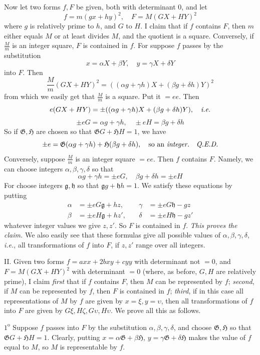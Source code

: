 Now let two forms $f,F$ be given, both with determinant 0, and let
\[
f=m(gx+hy)^2,\quad F=M(GX+HY)^2
\]
where $g$ is relatively prime to $h$, and $G$ to $H$. I claim that if $f$ contains $F$, then $m$ either equals $M$ or at least divides $M$, and the quotient is a square. Conversely, if $\frac{M}{m}$ is an integer square, $F$ is contained in $f$. For suppose $f$ passes by the substitution
\[
x=\alpha X+\beta Y,\quad y=\gamma X+\delta Y
\]
into $F$. Then
\[
\frac{M}{m}(GX+HY)^2=((\alpha g+\gamma h)X+(\beta g+\delta h)Y)^2
\]
from which we easily get that $\frac{M}{m}$ is a square. Put it $=ee$. Then
\[
e(GX+HY)=\pm((\alpha g+\gamma h)X+(\beta g+\delta h)Y),\quad\text{\textit{i.e.}}
\]
\[
\pm eG=\alpha g+\gamma h,\quad\pm eH=\beta g+\delta h
\]
So if $\mathfrak{G},\mathfrak{H}$ are chosen so that $\mathfrak{G}G+\mathfrak{H}H=1$, we have
\[
\pm e=\mathfrak{G}(\alpha g+\gamma h)+\mathfrak{H}(\beta g+\delta h),\quad\text{so an \textit{integer.}\quad\textit{Q.E.D.}}
\]
Conversely, suppose $\frac{M}{m}$ is an integer square $=ee$. Then $f$ contains $F$. Namely, we can choose integers $\alpha,\beta,\gamma,\delta$ so that
\[
\alpha g+\gamma h=\pm eG,\quad \beta g+\delta h=\pm eH
\]
For choose integers $\mathfrak{g},\mathfrak{h}$ so that $\mathfrak{g}g+\mathfrak{h}h=1$. We satisfy these equations by putting
\[
\begin{aligned}
\alpha&=\pm eG\mathfrak{g}+hz, &\quad\gamma&=\pm eG\mathfrak{h}-gz\\
\beta&=\pm eH\mathfrak{g}+hz', &\quad\delta&=\pm eH\mathfrak{h}-gz'
\end{aligned}
\]
whatever integer values we give $z,z'$. So $F$ is contained in $f$. \textit{This proves the claim.} We also easily see that these formulas give all possible values of $\alpha,\beta,\gamma,\delta$, \textit{i.e.}, all transformations of $f$ into $F$, if $z,z'$ range over all integers.

II. Given two forms $f=axx+2bxy+cyy$ with determinant not $=0$, and $F=M(GX+HY)^2$ with determinant $=0$ (where, as before, $G,H$ are relatively prime), I claim \textit{first} that if $f$ contains $F$, then $M$ can be represented by $f$; \textit{second}, if $M$ can be represented by $f$, then $F$ is contained in $f$; \textit{third}, if in this case all representations of $M$ by $f$ are given by $x=\xi,y=\upsilon$, then all transformations of $f$ into $F$ are given by $G\xi,H\zeta,G\upsilon,H\upsilon$. We prove all this as follows.

$1^{\mathrm{o}}$ Suppose $f$ passes into $F$ by the substitution $\alpha,\beta,\gamma,\delta$, and choose $\mathfrak{G},\mathfrak{H}$ so that $\mathfrak{G}G+\mathfrak{H}H=1$. Clearly, putting $x=\alpha\mathfrak{G}+\beta\mathfrak{H}$, $y=\gamma\mathfrak{G}+\delta\mathfrak{H}$ makes the value of $f$ equal to $M$, so $M$ is representable by $f$.

